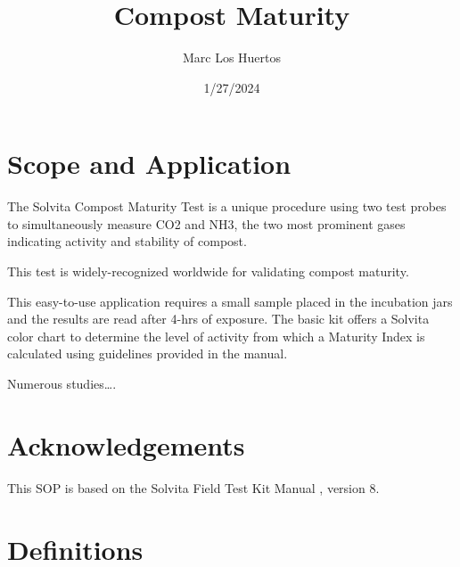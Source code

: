 \documentclass[12pt]{../SOP4_alpha}\usepackage[]{graphicx}\usepackage[]{xcolor}
\title{Compost Maturity}
\date{1/27/2024}
\author{Marc Los Huertos}
\begin{document}

\maketitle

\section{Scope and Application}

\NP The Solvita Compost Maturity Test is a unique procedure using two test probes to simultaneously measure CO2 and NH3, the two most prominent gases indicating activity and stability of compost.

\NP This test is widely-recognized worldwide for validating compost maturity.

\NP This easy-to-use application requires a small sample placed in the incubation jars and the results are read after 4-hrs of exposure.  The basic kit offers a Solvita color chart to determine the level of activity from which a Maturity Index is calculated using guidelines provided in the manual.

\NP 

\NP Numerous studies\ldots \citep{vargas2005assessing}.

\section{Acknowledgements}

\NP This SOP is based on the Solvita Field Test Kit Manual \citep{solvita2014}, version 8.

\section{Definitions}
\end{document}
